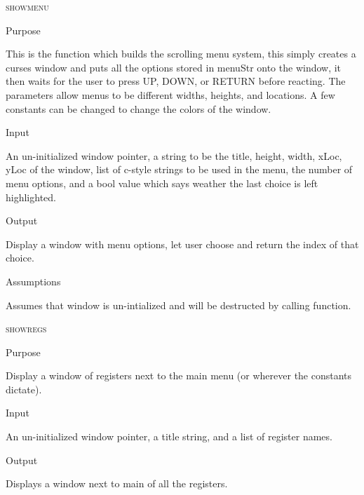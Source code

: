 \documentclass[pdftex, 11pt]{article}
\begin{document}
\begin{description}

	\item{\textsc{showmenu}}

		\begin{description}
			\item{Purpose}
				
 				This is the function which builds the scrolling menu system, this simply
				creates a curses window and puts all the options stored in menuStr onto the
				window, it then waits for the user to press UP, DOWN, or RETURN before
				reacting.  The parameters allow menus to be different widths, heights, and
				locations.  A few constants can be changed to change the colors of the window.

			\item{Input}

				An un-initialized window pointer, a string to be the title,
				height, width, xLoc, yLoc of the window, list of c-style
			   	strings to be used in the menu, the number of menu options,
				and a bool value which says weather the last choice is
				left highlighted.

			\item{Output}
				
				Display a window with menu options, let user choose and
				return the index of that choice.

			\item{Assumptions}

				Assumes that window is un-intialized and will be destructed
				by calling function.

		\end{description}


	\item{\textsc{showregs}}

		\begin{description}
			\item{Purpose}

 				Display a window of registers next to the main menu (or wherever the constants
				dictate).

			\item{Input}

				An un-initialized window pointer, a title string, and a
				list of register names.

			\item{Output}

				Displays a window next to main of all the registers.


\end{description}
\end{description}
\end{document}
